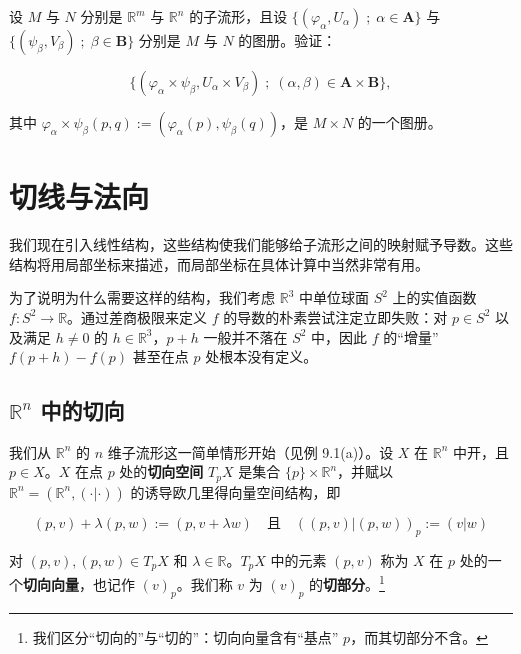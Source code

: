 \begin{exercises}
\item

设 $ M $ 与 $ N $ 分别是 $ \mathbb{R}^{m} $ 与 $ \mathbb{R}^{n} $ 的子流形，且设 $ \{ (\varphi_{\alpha}, U_{\alpha}) \;;\; \alpha \in \mathbf{A} \} $ 与 $ \{ (\psi_{\beta}, V_{\beta}) \;;\; \beta \in \mathbf{B} \} $ 分别是 $ M $ 与 $ N $ 的图册。验证：

\[
\{ (\varphi_{\alpha} \times \psi_{\beta}, U_{\alpha} \times V_{\beta}) \;;\; (\alpha, \beta) \in \mathbf{A} \times \mathbf{B} \} ,
\]

其中 $ \varphi_{\alpha} \times \psi_{\beta}(p, q) := (\varphi_{\alpha}(p), \psi_{\beta}(q)) $，是 $ M \times N $ 的一个图册。

\end{exercises}

\section{切线与法向}

我们现在引入线性结构，这些结构使我们能够给子流形之间的映射赋予导数。这些结构将用局部坐标来描述，而局部坐标在具体计算中当然非常有用。

为了说明为什么需要这样的结构，我们考虑 $ \mathbb{R}^{3} $ 中单位球面 $ S^{2} $ 上的实值函数 $ f : S^{2} \to \mathbb{R} $。通过差商极限来定义 $ f $ 的导数的朴素尝试注定立即失败：对 $ p \in S^{2} $ 以及满足 $ h \ne 0 $ 的 $ h \in \mathbb{R}^{3} $，$ p + h $ 一般并不落在 $ S^{2} $ 中，因此 $ f $ 的“增量” $ f(p + h) - f(p) $ 甚至在点 $ p $ 处根本没有定义。

\subsection*{$ \mathbb{R}^{n} $ 中的切向}

我们从 $ \mathbb{R}^{n} $ 的 $ n $ 维子流形这一简单情形开始（见例 9.1(a)）。设 $ X $ 在 $ \mathbb{R}^{n} $ 中开，且 $ p \in X $。$ X $ 在点 $ p $ 处的\textbf{切向空间} $ T_{p}X $ 是集合 $ \{p\}\times\mathbb{R}^{n} $，并赋以 $ \mathbb{R}^{n} = (\mathbb{R}^{n}, (\cdot|\cdot)) $ 的诱导欧几里得向量空间结构，即

\[
(p,v) + \lambda(p,w) := (p, v + \lambda w) \quad \text{且} \quad ((p,v)|(p,w))_{p} := (v|w)
\]

对 $ (p,v), (p,w) \in T_{p}X $ 和 $ \lambda \in \mathbb{R} $。$ T_{p}X $ 中的元素 $ (p,v) $ 称为 $ X $ 在 $ p $ 处的一个\textbf{切向向量}，也记作 $ (v)_{p} $。我们称 $ v $ 为 $ (v)_{p} $ 的\textbf{切部分}。\footnote{我们区分“切向的”与“切的”：切向向量含有“基点” $ p $，而其切部分不含。}

